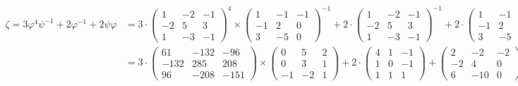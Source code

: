 \documentclass{article}
\begin{document}
\begin{align*}
\zeta = 3\varphi^4\psi^{-1} + 2\varphi^{-1} + 2\psi\varphi &= 3\cdot\begin{pmatrix}
1 & -2 & -1 \\
-2 & 5 & 3 \\
1 & -3 & -1
\end{pmatrix}^4\times\begin{pmatrix}
1 & -1 & -1 \\
-1 & 2 & 0 \\
3 & -5 & 0
\end{pmatrix}^{-1} + 2\cdot\begin{pmatrix}
1 & -2 & -1 \\
-2 & 5 & 3 \\
1 & -3 & -1
\end{pmatrix}^{-1} + 2 \cdot \begin{pmatrix}
1 & -1 & -1 \\
-1 & 2 & 0 \\
3 & -5 & 0
\end{pmatrix} \times \begin{pmatrix}
1 & -2 & -1 \\
-2 & 5 & 3 \\
1 & -3 & -1
\end{pmatrix} = \\
&= 3\cdot\begin{pmatrix}
61 & -132 & -96 \\
-132 & 285 & 208 \\
96 & -208 & -151
\end{pmatrix}\times\begin{pmatrix}
0 & 5 & 2 \\
0 & 3 & 1 \\
-1 & -2 & 1
\end{pmatrix} + 2 \cdot \begin{pmatrix}
4 & 1 & -1 \\
1 & 0 & -1 \\
1 & 1 & 1
\end{pmatrix} + \begin{pmatrix}
2 & -2 & -2 \\
-2 & 4 & 0 \\
6 & -10 & 0
\end{pmatrix} \times \begin{pmatrix}
1 & -2 & -1 \\
-2 & 5 & 3 \\
1 & -3 & -1
\end{pmatrix} =\\

\end{align*}
\end{document}
